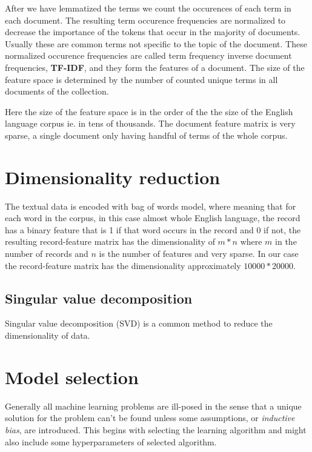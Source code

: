 After we have lemmatized the terms we count the occurences 
of each term in each document. The resulting term occurence 
frequencies are normalized to decrease the importance of the 
tokens that occur in the majority of documents. Usually these are 
common terms not specific to the topic of the document. 
These normalized occurence frequencies are called term 
frequency inverse document frequencies, \textbf{TF-IDF}, and 
they form the features of a document. The size of the feature 
space is determined by the number of counted unique terms in all 
documents of the collection. 

Here the size of the feature space is in the order of the the 
size of the English language corpus ie. in tens of thousands. The 
document feature matrix is very sparse, a single document only 
having handful of terms of the whole corpus. 



\section{Dimensionality reduction}
\label{sec:dimensionalityreduction}
The textual data is encoded with bag of words model, where 
meaning that for each word in the corpus, in this case almost 
whole English language, the record has a binary feature that is 1 
if that word occurs in the record and 0 if not, the resulting 
record-feature matrix has the dimensionality of $m*n$ where $m$ in 
the number of records and $n$ is the number of features and very 
sparse. In our case the record-feature matrix has the 
dimensionality approximately $10000*20000$. 


\subsection{Singular value decomposition}
Singular value decomposition (SVD) is a common method to reduce 
the dimensionality of data. 


\section{Model selection}
Generally all machine learning problems are ill-posed in the sense 
that a unique solution for the problem can't be found unless some
assumptions, or \emph{inductive bias}, are introduced. This begins 
with selecting the learning algorithm and might also include some
hyperparameters of selected algorithm.


